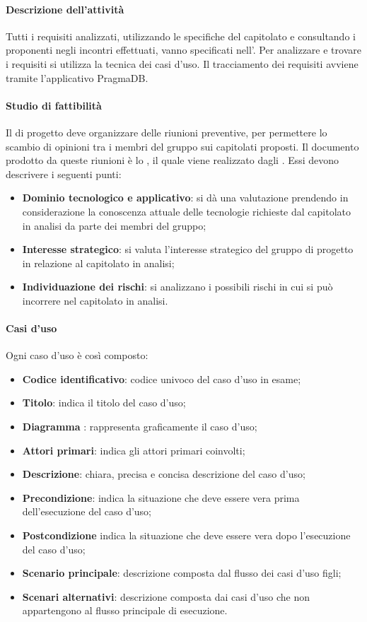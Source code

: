  \paragraph{Descrizione dell'attività}
 Tutti i requisiti analizzati, utilizzando le specifiche del capitolato e consultando i proponenti negli
incontri effettuati, vanno specificati nell'\ARdoc. Per analizzare e trovare i
requisiti si utilizza la tecnica dei casi d'uso. Il tracciamento dei requisiti avviene tramite l'applicativo PragmaDB.
 \paragraph{Studio di fattibilità}
 Il \RESP{} di progetto deve organizzare delle riunioni preventive, per permettere lo scambio
di opinioni tra i membri del gruppo sui capitolati proposti. Il documento prodotto da queste
riunioni è lo \SFdoc , il quale viene realizzato dagli \ANP{}. Essi devono
descrivere i seguenti punti:
\begin{itemize}
 \item \textbf{Dominio tecnologico e applicativo}: si dà una valutazione prendendo in   considerazione
 la conoscenza attuale delle tecnologie richieste dal capitolato in analisi da parte dei membri
del gruppo;
 \item \textbf{Interesse strategico}: si valuta l'interesse strategico del gruppo di progetto in relazione
al capitolato in analisi;
 \item \textbf{Individuazione dei rischi}: si analizzano i possibili rischi in cui si può incorrere nel
capitolato in analisi.
\end{itemize}
 \paragraph{Casi d'uso}
 Ogni caso d'uso è così composto:
 \begin{itemize}
  \item \textbf{Codice identificativo}: codice univoco del caso d'uso in esame;
  \item \textbf{Titolo}: indica il titolo del caso d'uso;
  \item \textbf{Diagramma }: rappresenta graficamente il caso d'uso;
  \item \textbf{Attori primari}: indica gli attori primari coinvolti;
  \item \textbf{Descrizione}: chiara, precisa e concisa descrizione del caso d'uso;
  \item \textbf{Precondizione}: indica la situazione che deve essere vera prima dell'esecuzione del caso d'uso;
  \item \textbf{Postcondizione} indica la situazione che deve essere vera dopo l'esecuzione del caso d'uso;
  \item \textbf{Scenario principale}: descrizione composta dal flusso dei casi d'uso figli;
  \item \textbf{Scenari alternativi}: descrizione composta dai casi d'uso che non appartengono al flusso
principale di esecuzione.
 \end{itemize}

